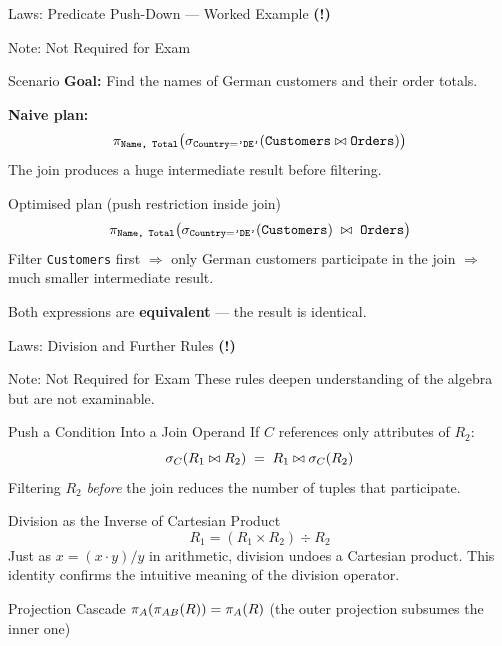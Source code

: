 \begin{frame}{Laws: Predicate Push-Down --- Worked Example \textbf{(!)}}
  \begin{alertblock}{Note: Not Required for Exam}
  \end{alertblock}

  \begin{block}{Scenario}
    \textbf{Goal:} Find the names of German customers and their order totals.

    \textbf{Naive plan:}
    \[
      \pi_{\texttt{Name, Total}}\!\left(
        \sigma_{\texttt{Country}=\texttt{'DE'}}(\texttt{Customers} \bowtie \texttt{Orders})
      \right)
    \]
    The join produces a huge intermediate result before filtering.
  \end{block}

  \begin{block}{Optimised plan (push restriction inside join)}
    \[
      \pi_{\texttt{Name, Total}}\!\left(
        \sigma_{\texttt{Country}=\texttt{'DE'}}(\texttt{Customers})
        \;\bowtie\;
        \texttt{Orders}
      \right)
    \]
    Filter \texttt{Customers} first $\Rightarrow$ only German customers
    participate in the join $\Rightarrow$ much smaller intermediate result.
  \end{block}

  Both expressions are \textbf{equivalent} --- the result is identical.
\end{frame}

\begin{frame}{Laws: Division and Further Rules \textbf{(!)}}
  \begin{alertblock}{Note: Not Required for Exam}
    These rules deepen understanding of the algebra but are not examinable.
  \end{alertblock}

  \begin{block}{Push a Condition Into a Join Operand}
    If $C$ references only attributes of $R_2$:
    \[
      \sigma_{C}(R_1 \bowtie R_2) \;=\; R_1 \bowtie \sigma_{C}(R_2)
    \]
    Filtering $R_2$ \emph{before} the join reduces the number of tuples
    that participate.
  \end{block}

  \begin{block}{Division as the Inverse of Cartesian Product}
    \[
      R_1 = (R_1 \times R_2) \div R_2
    \]
    Just as $x = (x \cdot y) / y$ in arithmetic, division undoes a Cartesian
    product.  This identity confirms the intuitive meaning of the division
    operator.
  \end{block}

  \begin{block}{Projection Cascade}
    $\pi_{A}(\pi_{AB}(R)) = \pi_{A}(R)$
    \quad (the outer projection subsumes the inner one)
  \end{block}
\end{frame}

